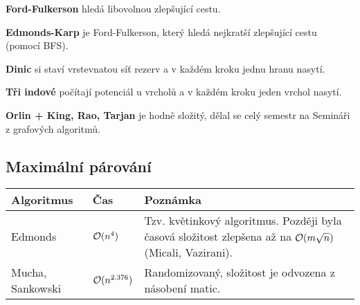\begin{itemize*}
\item \textbf{Ford-Fulkerson} hledá libovolnou zlepšující cestu.
\item \textbf{Edmonds-Karp} je Ford-Fulkerson, který hledá nejkratší
zlepšující cestu (pomocí BFS).
\item \textbf{Dinic} si staví vrstevnatou síť rezerv a v každém kroku jednu
hranu nasytí.
\item \textbf{Tři indové} počítají potenciál u vrcholů a v každém kroku
jeden vrchol nasytí.
\item \textbf{Orlin + King, Rao, Tarjan} je hodně složitý, dělal se celý
semestr na Semináři z grafových algoritmů.
\end{itemize*}

\subsection{Maximální párování}

\begin{center}
\begin{tabular}{ l l p{10cm} }
	\hline
	\bf Algoritmus & \bf Čas & \bf Poznámka \\
	\hline
	Edmonds & $\mathcal{O}(n^4)$ & Tzv. květinkový algoritmus. Později byla časová složitost zlepšena až na $\mathcal{O}(m\sqrt n)$ (Micali, Vazirani). \\
	Mucha, Sankowski & $\mathcal{O}(n^{2.376})$ & Randomizovaný, složitost je odvozena z násobení matic. \\
	\hline
\end{tabular}
\end{center}


\renewcommand{\arraystretch}{1.0}
